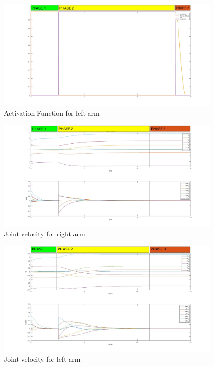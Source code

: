 \documentclass{article}
\begin{document}
\begin{figure}[h]
	\centering
	\includegraphics[width=1\textwidth]{imgs/ex2/activation left .jpg}
	\caption{\label{fig:1} Activation Function for left arm}
\end{figure}
\begin{figure}[h]
	\centering
	\includegraphics[width=1\textwidth]{imgs/ex2/joint_velocity right.jpg}
	\caption{\label{fig:1} Joint velocity for right arm}
\end{figure}
\begin{figure}[h]
	\centering
	\includegraphics[width=1\textwidth]{imgs/ex2/joint_velocity left.jpg}
	\caption{\label{fig:1} Joint velocity for left arm}
\end{figure}
\end{document}
